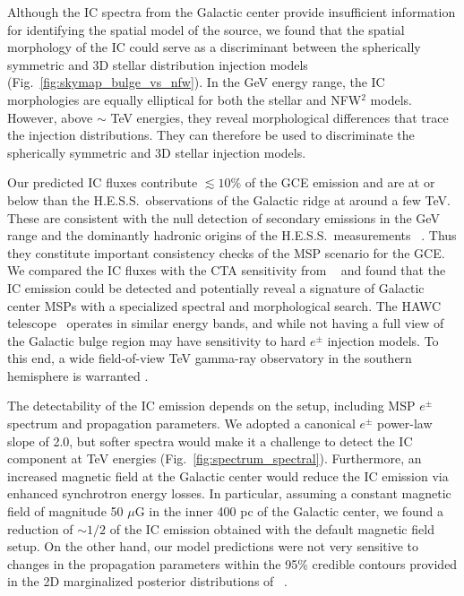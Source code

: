 \documentclass[doublespace,nopageskip]{VTthesis} %
\begin{document}
Although the IC spectra from the Galactic center provide insufficient information for identifying the spatial model of the source, we found that the spatial morphology of the IC could serve as a discriminant between the spherically symmetric and 3D stellar distribution injection models (Fig.~\ref{fig:skymap_bulge_vs_nfw}). In the GeV energy range, the IC morphologies are equally elliptical for both the stellar and NFW$^2$ models. However, above $\sim$ TeV energies, they reveal morphological differences that trace the injection distributions. They can therefore be used to discriminate the spherically symmetric and 3D stellar injection models.

Our predicted IC fluxes contribute $\lesssim 10 \%$ of the GCE emission and are at or below than the H.E.S.S.~observations of the Galactic ridge at around a  few TeV. These are consistent with the null detection of secondary emissions in the GeV range \cite{2016PhRvD..93j3004L} and the dominantly hadronic origins of the H.E.S.S.~measurements ~\cite{2017PhRvL.119c1101G,2016Natur.531..476H}. Thus they constitute important consistency checks of the MSP scenario for the GCE. We compared the IC fluxes with the CTA sensitivity from ~\citet{2015JCAP...03..055S} and found that the IC emission could be detected and potentially reveal a signature of Galactic center MSPs with a specialized spectral and morphological search. The HAWC telescope~\cite{2012NIMPA.692...72D,2013arXiv1310.0074H} operates in similar energy bands, and while not having a full view of the Galactic bulge region may have sensitivity to hard $e^\pm$ injection models. To this end, a wide field-of-view TeV gamma-ray observatory in the southern hemisphere is warranted \cite{2017ICRC...35..851M}.

The detectability of the IC emission depends on the setup, including MSP $e^\pm$ spectrum and propagation parameters. We adopted a canonical $e^\pm$ power-law slope of 2.0, but softer spectra would make it a challenge to detect the IC component at TeV energies (Fig.~\ref{fig:spectrum_spectral}). Furthermore, an increased magnetic field at the Galactic center would reduce the IC emission via enhanced synchrotron energy losses. In particular, assuming a constant magnetic field of magnitude 50 $\mu$G in the inner 400 pc of the Galactic center, we found a reduction of $\sim 1/2$ of the IC emission obtained with the default magnetic field setup. On the other hand, our model predictions were not very sensitive to changes in the propagation parameters within the 95\% credible contours provided in the 2D marginalized posterior distributions of ~\citet{2016ApJ...824...16J}.
\end{document}
